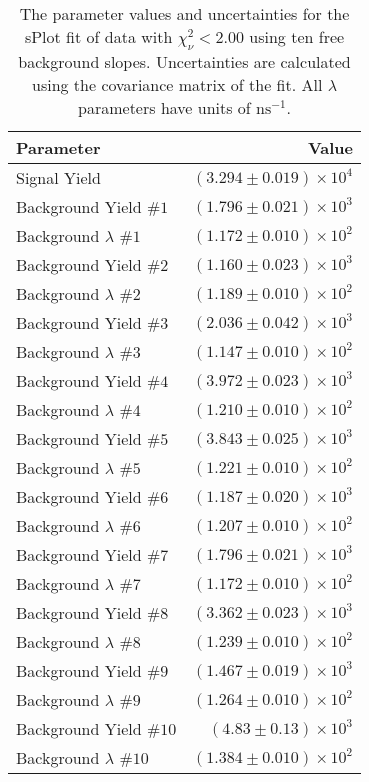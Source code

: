 
\begin{table}[ht]
    \begin{center}
        \begin{tabular}{lr}\toprule
            Parameter & Value \\\midrule
            Signal Yield & $(3.294 \pm 0.019) \times 10^{4}$ \\
            Background Yield $\#1$ & $(1.796 \pm 0.021) \times 10^{3}$ \\
            Background $\lambda$ $\#1$ & $(1.172 \pm 0.010) \times 10^{2}$ \\
            Background Yield $\#2$ & $(1.160 \pm 0.023) \times 10^{3}$ \\
            Background $\lambda$ $\#2$ & $(1.189 \pm 0.010) \times 10^{2}$ \\
            Background Yield $\#3$ & $(2.036 \pm 0.042) \times 10^{3}$ \\
            Background $\lambda$ $\#3$ & $(1.147 \pm 0.010) \times 10^{2}$ \\
            Background Yield $\#4$ & $(3.972 \pm 0.023) \times 10^{3}$ \\
            Background $\lambda$ $\#4$ & $(1.210 \pm 0.010) \times 10^{2}$ \\
            Background Yield $\#5$ & $(3.843 \pm 0.025) \times 10^{3}$ \\
            Background $\lambda$ $\#5$ & $(1.221 \pm 0.010) \times 10^{2}$ \\
            Background Yield $\#6$ & $(1.187 \pm 0.020) \times 10^{3}$ \\
            Background $\lambda$ $\#6$ & $(1.207 \pm 0.010) \times 10^{2}$ \\
            Background Yield $\#7$ & $(1.796 \pm 0.021) \times 10^{3}$ \\
            Background $\lambda$ $\#7$ & $(1.172 \pm 0.010) \times 10^{2}$ \\
            Background Yield $\#8$ & $(3.362 \pm 0.023) \times 10^{3}$ \\
            Background $\lambda$ $\#8$ & $(1.239 \pm 0.010) \times 10^{2}$ \\
            Background Yield $\#9$ & $(1.467 \pm 0.019) \times 10^{3}$ \\
            Background $\lambda$ $\#9$ & $(1.264 \pm 0.010) \times 10^{2}$ \\
            Background Yield $\#10$ & $(4.83 \pm 0.13) \times 10^{3}$ \\
            Background $\lambda$ $\#10$ & $(1.384 \pm 0.010) \times 10^{2}$ \\\bottomrule
        \end{tabular}
        \caption{The parameter values and uncertainties for the sPlot fit of data with $\chi^2_\nu < 2.00$ using ten free background slopes. Uncertainties are calculated using the covariance matrix of the fit. All $\lambda$ parameters have units of $\si{\nano\second}^{-1}$.}\label{tab:splot-fit-results-chisqdof-2.00-free-10}
    \end{center}
\end{table}

